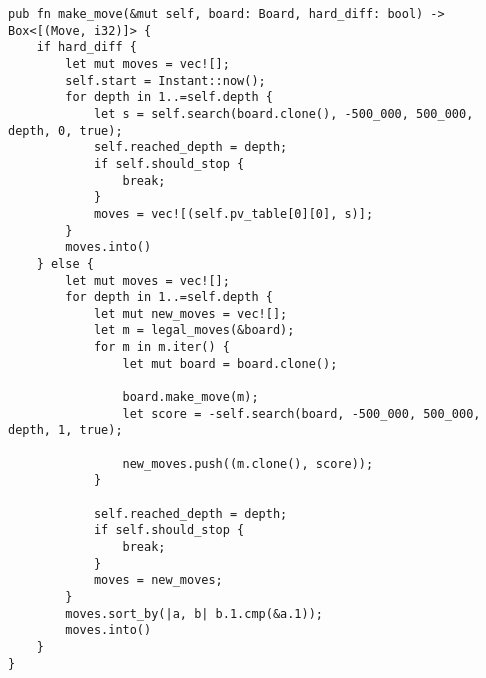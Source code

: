 \begin{lstlisting}[language=RustHtml]
pub fn make_move(&mut self, board: Board, hard_diff: bool) -> Box<[(Move, i32)]> {
    if hard_diff {
        let mut moves = vec![];
        self.start = Instant::now();
        for depth in 1..=self.depth {
            let s = self.search(board.clone(), -500_000, 500_000, depth, 0, true);
            self.reached_depth = depth;
            if self.should_stop {
                break;
            }
            moves = vec![(self.pv_table[0][0], s)];
        }
        moves.into()
    } else {
        let mut moves = vec![];
        for depth in 1..=self.depth {
            let mut new_moves = vec![];
            let m = legal_moves(&board);
            for m in m.iter() {
                let mut board = board.clone();

                board.make_move(m);
                let score = -self.search(board, -500_000, 500_000, depth, 1, true);

                new_moves.push((m.clone(), score));
            }

            self.reached_depth = depth;
            if self.should_stop {
                break;
            }
            moves = new_moves;
        }
        moves.sort_by(|a, b| b.1.cmp(&a.1));
        moves.into()
    }
}
\end{lstlisting}

